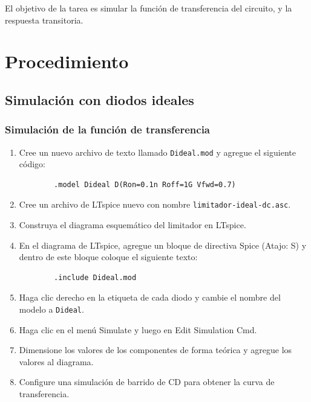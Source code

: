 \documentclass[11pt]{article}
\begin{document}
El objetivo de la tarea es simular la función de transferencia del circuito, y la respuesta transitoria.

\section{Procedimiento}

\subsection{Simulación con diodos ideales}

\subsubsection{Simulación de la función de transferencia}

\begin{enumerate}
    \item Cree un nuevo archivo de texto llamado \texttt{Dideal.mod} y agregue el siguiente código:

    \begin{verbatim}
        .model Dideal D(Ron=0.1n Roff=1G Vfwd=0.7)
    \end{verbatim}

    \item Cree un archivo de LTspice nuevo con nombre \texttt{limitador-ideal-dc.asc}.
    \item Construya el diagrama esquemático del limitador en LTspice.
    \item En el diagrama de LTspice, agregue un bloque de directiva Spice (Atajo: S) y dentro de este bloque coloque el siguiente texto:

    \begin{verbatim}
        .include Dideal.mod
    \end{verbatim}
    
    \item Haga clic derecho en la etiqueta de cada diodo y cambie el nombre del modelo a \texttt{Dideal}.
    \item Haga clic en el menú Simulate y luego en Edit Simulation Cmd.
    \item Dimensione los valores de los componentes de forma teórica y agregue los valores al diagrama.
    \item Configure una simulación de barrido de CD para obtener la curva de transferencia.
\end{enumerate}
\end{document}
